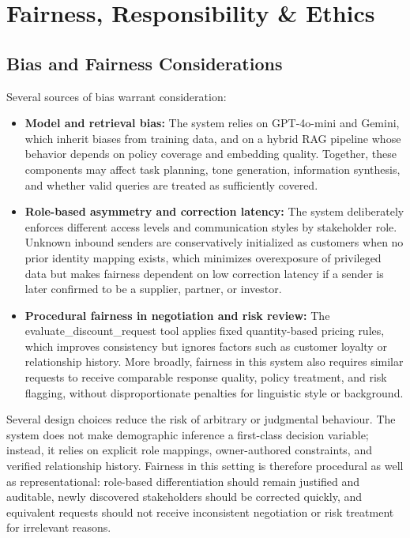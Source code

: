 \documentclass[11pt]{article}
\begin{document}
\section{Fairness, Responsibility \& Ethics}

\subsection{Bias and Fairness Considerations}

Several sources of bias warrant consideration:

\begin{itemize}
\item \textbf{Model and retrieval bias:} The system relies on GPT-4o-mini and Gemini, which inherit biases from training data, and on a hybrid RAG pipeline whose behavior depends on policy coverage and embedding quality. Together, these components may affect task planning, tone generation, information synthesis, and whether valid queries are treated as sufficiently covered.

\item \textbf{Role-based asymmetry and correction latency:} The system deliberately enforces different access levels and communication styles by stakeholder role. Unknown inbound senders are conservatively initialized as customers when no prior identity mapping exists, which minimizes overexposure of privileged data but makes fairness dependent on low correction latency if a sender is later confirmed to be a supplier, partner, or investor.

\item \textbf{Procedural fairness in negotiation and risk review:} The evaluate\_discount\_request tool applies fixed quantity-based pricing rules, which improves consistency but ignores factors such as customer loyalty or relationship history. More broadly, fairness in this system also requires similar requests to receive comparable response quality, policy treatment, and risk flagging, without disproportionate penalties for linguistic style or background.
\end{itemize}

Several design choices reduce the risk of arbitrary or judgmental behaviour. The system does not make demographic inference a first-class decision variable; instead, it relies on explicit role mappings, owner-authored constraints, and verified relationship history. Fairness in this setting is therefore procedural as well as representational: role-based differentiation should remain justified and auditable, newly discovered stakeholders should be corrected quickly, and equivalent requests should not receive inconsistent negotiation or risk treatment for irrelevant reasons.
\end{document}
